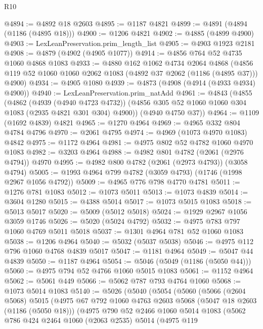 \begin{lexlean}{R10}
\begin{coremodule}
@4894 := @4892 @18 @2603
@4895 := @1187 @4821
@4899 := @4891 (@4894 (@1186 (@4895 @18)))
@4900 := @1206 @4821
@4902 := @4885 (@4899 @4900)
@4903 := LexLeanPreservation.prim_length_list
@4905 := @4903 @1923 @2181
@4908 := @4879 (@4902 (@4905 @1077))
@4914 := @4856 @764 @52 @4735 @1060 @4868 @1083
@4933 := @4880
    @162
    @1062
    @4734
    @2064
    @4868
    (@4856 @119 @52 @1060 @1060 @2062 @1083 (@4892 @37 @2062 (@1186 (@4895 @37))) @4900)
@4934 := @4905 @1080
@4939 := @4873 (@4908 (@4914 (@4933 @4934) @4900))
@4940 := LexLeanPreservation.prim_natAdd
@4961 := @4843
    (@4855
      (@4862
        (@4939 (@4940 @4723 @4732))
        (@4856 @305 @52 @1060 @1060 @304 @1083 (@2935 @4821 @301 @304) @4900))
      (@4940 @4750 @37))
@4964 := @1109 (@1692 @4839) @4821
@4965 := @1270 @4964
@4969 := @4965 @332 @804 @4784 @4796
@4970 := @2061 @4795
@4974 := @4969 (@1073 @4970 @1083) @4842
@4975 := @1172 @4964
@4981 := @4975 @802 @52 @4782 @1060 @4970 @1083
@4982 := @3203 @4964
@4988 := @4982 @801 @4782 (@2061 (@2976 @4794)) @4970
@4995 := @4982 @800 @4782 (@2061 (@2973 @4793)) (@3058 @4794)
@5005 := @1993 @4964 @799 @4782 (@3059 @4793) (@1746 (@1998 @2967 @1056 @4792))
@5009 := @4965 @776 @798 @4770 @4781
@5011 := @1276 @781 @1083
@5012 := @1073 @5011
@5013 := @1073 @4839
@5014 := @3604 @1280
@5015 := @4388 @5014
@5017 := @1073 @5015 @1083
@5018 := @5013 @5017
@5020 := @5009 (@5012 @5018)
@5024 := @1929 @2967 @1056 @3059 @1746
@5026 := @5020 (@5024 @4792)
@5032 := @4975 @783 @797 @1060 @4769 @5011 @5018
@5037 := @1301 @4964 @781 @52 @1060 @1083
@5038 := @1206 @4964
@5040 := @5032 (@5037 @5038)
@5046 := @4975 @112 @796 @1060 @4768 @4839 @5017
@5047 := @1181 @4964
@5049 := @5047 @44 @4839
@5050 := @1187 @4964
@5054 := @5046 (@5049 (@1186 (@5050 @44)))
@5060 := @4975 @794 @52 @4766 @1060 @5015 @1083
@5061 := @1152 @4964
@5062 := @5061 @449
@5066 := @5062 @787 @793 @4764 @1060
@5068 := @1073 @5014 @1083
@5140 := @5026
    (@5040
      (@5054
        (@5060
          (@5066
            (@2604 @5068)
            @5015
            (@4975
              @67
              @792
              @1060
              @4763
              @2603
              @5068
              (@5047 @18 @2603 (@1186 (@5050 @18)))
              (@4975
                @790
                @52
                @2466
                @1060
                @5014
                @1083
                (@5062
                  @786
                  @424
                  @2464
                  @1060
                  (@2063 @2535)
                  @5014
                  (@4975
                    @119

\end{coremodule}
\end{lexlean}
